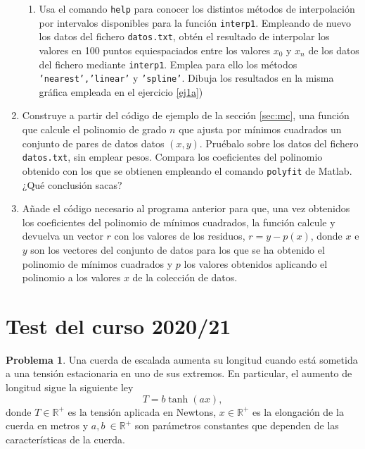 \begin{enumerate}
\begin{enumerate}
\item Usa el comando \texttt{help} para conocer los distintos métodos de interpolación por intervalos disponibles  para la función \texttt{interp1}. Empleando de nuevo los datos del fichero \texttt{datos.txt}, obtén el resultado de interpolar los valores en 100 puntos equiespaciados entre los valores $x_0$ y $x_{n}$ de los datos del fichero mediante \texttt{interp1}.  Emplea para ello los métodos \texttt{'nearest','linear'} y \texttt{'spline'}. Dibuja los resultados en la misma gráfica empleada en el ejercicio  \ref{ej1a})
\end{enumerate}
\item Construye a partir del código de ejemplo de la sección \ref{sec:mc}, una función que calcule el polinomio de grado $n$ que ajusta por mínimos cuadrados un conjunto de pares de datos datos $(x, y)$. Pruébalo sobre los datos del fichero \texttt{datos.txt}, sin emplear pesos. Compara los coeficientes del polinomio obtenido con los que se obtienen empleando el comando \texttt{polyfit} de Matlab. ¿Qué conclusión sacas?

\item Añade el código necesario al programa anterior para que, una vez obtenidos los coeficientes del polinomio de mínimos cuadrados, la función calcule y devuelva un vector $r$ con los valores de los residuos, $r = y -p(x)$, donde $x$ e $y$ son los vectores del conjunto de datos para los que se ha obtenido el polinomio de mínimos cuadrados y $p$ los valores obtenidos aplicando el polinomio a los valores $x$ de la colección de datos.
\end{enumerate}


\section{Test del curso 2020/21}


\noindent \textbf{Problema 1}. Una cuerda de escalada aumenta su longitud cuando está sometida a una tensión estacionaria en uno de sus extremos. En particular, el aumento de longitud sigue la siguiente ley
\begin{equation}\label{eq:0}
T = b\tanh(ax),
\end{equation}
donde $T \in \mathbb{R}^+$ es la tensión aplicada en Newtons, $x \in \mathbb{R}^+$ es la elongación de la cuerda en metros y $a, b \ \in \mathbb{R}^+$ son parámetros constantes que dependen de las características de la cuerda.

